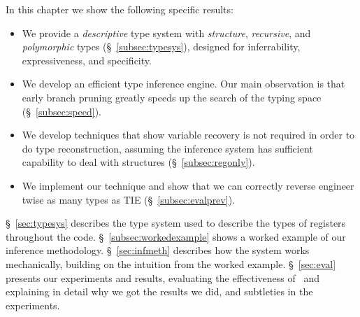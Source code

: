 In this chapter we show the following specific results:
\begin{itemize}
\item We provide a \emph{descriptive} type system with \emph{structure}, \emph {recursive}, and \emph{polymorphic} types (\S~\ref{subsec:typesys}), designed for inferrability, expressiveness, and specificity.
\item We develop an efficient type inference engine. Our main observation is that early branch pruning greatly speeds up the search of the typing space (\S~\ref{subsec:speed}).
\item We develop techniques that show variable recovery is not required in order to do type reconstruction, assuming the inference system has sufficient capability to deal with structures (\S~\ref{subsec:regonly}).
\item We implement our technique and show that we can correctly reverse engineer twise as many types as TIE (\S~\ref{subsec:evalprev}).
\end{itemize}

\S~\ref{sec:typesys} describes the type system used to describe the types of registers throughout the code. \S~\ref{subsec:workedexample} shows a worked example of our inference methodology. \S~\ref{sec:infmeth} describes how the system works mechanically, building on the intuition from the worked example. \S~\ref{sec:eval} presents our experiments and results, evaluating the effectiveness of \bitr\ and explaining in detail why we got the results we did, and subtleties in the experiments.
